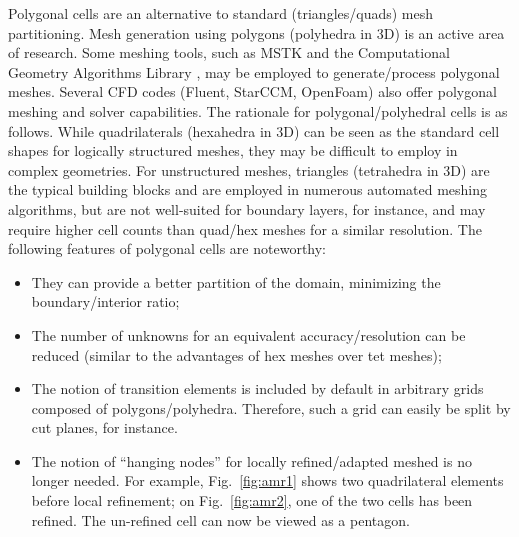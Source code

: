 \documentclass[preprint,10pt]{elsarticle}
\newcommand{\fig}[1]{Fig.~\ref{#1}}                      %
\begin{document}
Polygonal cells are an alternative to standard (triangles/quads) mesh partitioning.
Mesh generation using polygons (polyhedra in 3D) is an active area of research.
Some meshing tools, such as MSTK \cite{mstk} and the Computational Geometry Algorithms 
Library \cite{cgal}, may be employed to generate/process polygonal meshes.  
Several CFD codes (Fluent, StarCCM, OpenFoam) also offer polygonal meshing and solver capabilities. 
%
The rationale for polygonal/polyhedral cells is as follows.
While quadrilaterals (hexahedra in 3D) can be seen as the standard cell shapes for logically 
structured meshes, they may be difficult to employ in complex geometries. For unstructured meshes,
triangles (tetrahedra in 3D) are the typical building blocks and are employed in 
numerous automated meshing algorithms, but are not well-suited for boundary layers, 
for instance, and may require higher cell counts than quad/hex meshes for a similar
resolution.  The following features of polygonal cells are noteworthy:
\begin{itemize}
  \item They can provide a better partition of the domain, minimizing the boundary/interior ratio;
  \item The number of unknowns for an equivalent accuracy/resolution can be reduced (similar to the advantages of 
	hex meshes over tet meshes);
	\item The notion of transition elements is included by default in arbitrary grids composed of
	polygons/polyhedra. Therefore, such a grid can easily be split by cut planes, for 
	instance. 
  \item The notion of ``hanging nodes'' for locally refined/adapted meshed is no longer needed.
	For example, \fig{fig:amr1} shows two quadrilateral elements before local refinement; on
	\fig{fig:amr2}, one of the two cells has been refined. The un-refined cell can now be viewed as a
	pentagon.
\end{itemize}
\end{document}
